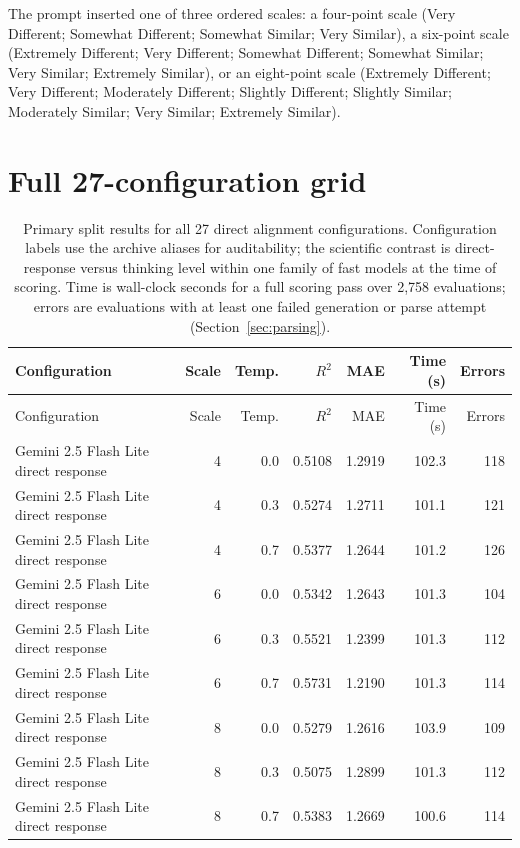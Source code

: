 \documentclass[11pt]{article}
\begin{document}
The prompt inserted one of three ordered scales: a four-point scale (Very
Different; Somewhat Different; Somewhat Similar; Very Similar), a six-point
scale (Extremely Different; Very Different; Somewhat Different; Somewhat
Similar; Very Similar; Extremely Similar), or an eight-point scale (Extremely
Different; Very Different; Moderately Different; Slightly Different; Slightly
Similar; Moderately Similar; Very Similar; Extremely Similar).

\section{Full 27-configuration grid}
\label{app:fullgrid}

\small
\begin{longtable}{L{1.75in}rrrrrr}
\caption{Primary split results for all 27 direct alignment configurations. Configuration labels use the archive aliases for auditability; the scientific contrast is direct-response versus thinking level within one family of fast models at the time of scoring. Time is wall-clock seconds for a full scoring pass over 2,758 evaluations; errors are evaluations with at least one failed generation or parse attempt (Section~\ref{sec:parsing}).}\label{tab:fullgrid}\\
\toprule
Configuration & Scale & Temp. & $R^2$ & MAE & Time (s) & Errors \\
\midrule
\endfirsthead
\toprule
Configuration & Scale & Temp. & $R^2$ & MAE & Time (s) & Errors \\
\midrule
\endhead
Gemini 2.5 Flash Lite direct response & 4 & 0.0 & 0.5108 & 1.2919 & 102.3 & 118 \\
Gemini 2.5 Flash Lite direct response & 4 & 0.3 & 0.5274 & 1.2711 & 101.1 & 121 \\
Gemini 2.5 Flash Lite direct response & 4 & 0.7 & 0.5377 & 1.2644 & 101.2 & 126 \\
Gemini 2.5 Flash Lite direct response & 6 & 0.0 & 0.5342 & 1.2643 & 101.3 & 104 \\
Gemini 2.5 Flash Lite direct response & 6 & 0.3 & 0.5521 & 1.2399 & 101.3 & 112 \\
Gemini 2.5 Flash Lite direct response & 6 & 0.7 & 0.5731 & 1.2190 & 101.3 & 114 \\
Gemini 2.5 Flash Lite direct response & 8 & 0.0 & 0.5279 & 1.2616 & 103.9 & 109 \\
Gemini 2.5 Flash Lite direct response & 8 & 0.3 & 0.5075 & 1.2899 & 101.3 & 112 \\
Gemini 2.5 Flash Lite direct response & 8 & 0.7 & 0.5383 & 1.2669 & 100.6 & 114 \\

\end{longtable}
\end{document}
